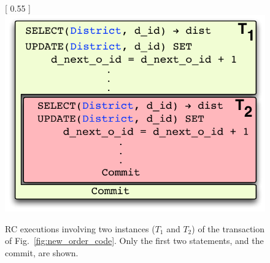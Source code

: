 \begin{figure}[!h]
\centering
{} [
  0.55\columnwidth
] {
  \includegraphics[scale=0.45]{Figures/motiv-eg-1-b}
}
  \caption{\small RC executions involving two instances ($T_1$ and
  $T_2$) of the  transaction of
  Fig.~\ref{fig:new_order_code}. Only the first two statements, and
  the commit, are shown.}
\label{fig:rc-ex}
\end{figure}

